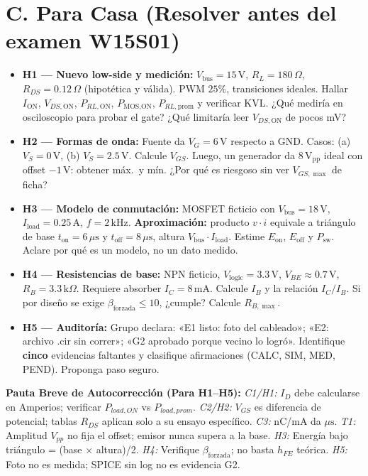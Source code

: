 \documentclass[11pt, a4paper]{article}
\begin{document}
\section*{C. Para Casa (Resolver antes del examen W15S01)}
\begin{itemize}[leftmargin=*]
    \item \textbf{H1 — Nuevo low-side y medición:} $V_{\text{bus}}=15\,\text{V}$, $R_L=180\,\Omega$, $R_{DS}=0.12\,\Omega$ (hipotética y válida). PWM $25\%$, transiciones ideales. Hallar $I_{\text{ON}}$, $V_{DS,\text{ON}}$, $P_{RL,\text{ON}}$, $P_{\text{MOS,ON}}$, $P_{RL,\text{prom}}$ y verificar KVL. ¿Qué mediría en osciloscopio para probar el gate? ¿Qué limitaría leer $V_{DS,\text{ON}}$ de pocos mV?
    \item \textbf{H2 — Formas de onda:} Fuente da $V_G = 6\,\text{V}$ respecto a GND. Casos: (a) $V_S=0\,\text{V}$, (b) $V_S=2.5\,\text{V}$. Calcule $V_{GS}$. Luego, un generador da $8\,\text{V}_{\text{pp}}$ ideal con offset $-1\,\text{V}$: obtener máx.\ y mín. ¿Por qué es riesgoso sin ver $V_{GS,\max}$ de ficha?
    \item \textbf{H3 — Modelo de conmutación:} MOSFET ficticio con $V_{\text{bus}}=18\,\text{V}$, $I_{\text{load}}=0.25\,\text{A}$, $f=2\,\text{kHz}$. \textbf{Aproximación:} producto $v \cdot i$ equivale a triángulo de base $t_{\text{on}}=6\,\mu\text{s}$ y $t_{\text{off}}=8\,\mu\text{s}$, altura $V_{\text{bus}} \cdot I_{\text{load}}$. Estime $E_{\text{on}}$, $E_{\text{off}}$ y $P_{\text{sw}}$. Aclare por qué es un modelo, no un dato medido.
    \item \textbf{H4 — Resistencias de base:} NPN ficticio, $V_{\text{logic}}=3.3\,\text{V}$, $V_{BE} \approx 0.7\,\text{V}$, $R_B=3.3\,\text{k}\Omega$. Requiere absorber $I_C=8\,\text{mA}$. Calcule $I_B$ y la relación $I_C/I_B$. Si por diseño se exige $\beta_{\text{forzada}} \le 10$, ¿cumple? Calcule $R_{B,\max}$.
    \item \textbf{H5 — Auditoría:} Grupo declara: «E1 listo: foto del cableado»; «E2: archivo .cir sin correr»; «G2 aprobado porque vecino lo logró». Identifique \textbf{cinco} evidencias faltantes y clasifique afirmaciones (CALC, SIM, MED, PEND). Proponga paso seguro.
\end{itemize}

\vspace{0.4cm}
\noindent
\textbf{Pauta Breve de Autocorrección (Para H1--H5):}
\textit{C1/H1:} $I_D$ debe calcularse en Amperios; verificar $P_{load, ON}$ vs $P_{load, prom}$. \textit{C2/H2:} $V_{GS}$ es diferencia de potencial; tablas $R_{DS}$ aplican solo a su ensayo específico. \textit{C3:} nC/mA da $\mu\text{s}$. \textit{T1:} Amplitud $V_{pp}$ no fija el offset; emisor nunca supera a la base. \textit{H3:} Energía bajo triángulo = (base $\times$ altura)/2. \textit{H4:} Verifique $\beta_{\text{forzada}}$; no basta $h_{FE}$ teórica. \textit{H5:} Foto no es medida; SPICE sin log no es evidencia G2.
\end{document}
